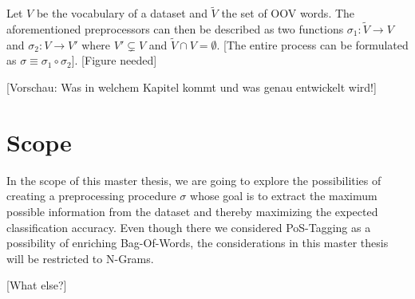 Let $V$ be the vocabulary of a dataset and $\tilde{V}$ the set of OOV words. The
aforementioned preprocessors can then be described as two functions $\sigma_1:
\tilde{V} \to V$ and  $\sigma_2: V \to V'$ where $V' \subsetneq V$ and
$\tilde{V} \cap V = \emptyset$. [The entire process can be formulated as $\sigma
\equiv \sigma_1 \circ \sigma_2$]. [Figure needed]

[Vorschau: Was in welchem Kapitel kommt und was genau entwickelt wird!]

\section{Scope}

In the scope of this master thesis, we are going to explore the possibilities of
creating a preprocessing procedure $\sigma$ whose goal is to extract the maximum
possible information from the dataset and thereby maximizing the expected
classification accuracy. Even though there we considered PoS-Tagging as a
possibility of enriching Bag-Of-Words, the considerations in this master
thesis will be restricted to N-Grams.    

[What else?] 
